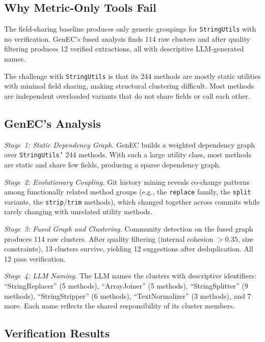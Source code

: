 \documentclass[sigconf]{acmart}
\begin{document}
\subsection{Why Metric-Only Tools Fail}
\label{sec:metric-fail}

The field-sharing baseline produces only generic groupings for
\texttt{StringUtils} with no verification. GenEC's fused analysis finds 114
raw clusters and after quality filtering produces 12 verified extractions,
all with descriptive LLM-generated names.

The challenge with \texttt{StringUtils} is that its 244 methods are mostly
static utilities with minimal field sharing, making structural clustering
difficult. Most methods are independent overloaded variants that do not share
fields or
call each other.

\subsection{GenEC's Analysis}
\label{sec:genec-analysis}

\textit{Stage~1: Static Dependency Graph.}  GenEC builds a weighted dependency
graph over \texttt{StringUtils'} 244 methods. With such a large utility class,
most methods are static and share few fields, producing a sparse dependency
graph.

\textit{Stage~2: Evolutionary Coupling.}  Git history mining reveals co-change
patterns among functionally related method groups (e.g., the \texttt{replace}
family, the \texttt{split} variants, the \texttt{strip}/\texttt{trim} methods),
which changed together across commits while rarely changing with unrelated
utility methods.

\textit{Stage~3: Fused Graph and Clustering.}  Community detection on the fused
graph produces 114 raw clusters. After quality filtering (internal cohesion
$> 0.35$, size constraints), 13 clusters survive, yielding 12 suggestions after
deduplication. All 12 pass verification.

\textit{Stage~4: LLM Naming.}  The LLM names the clusters with descriptive
identifiers: ``StringReplacer'' (5 methods), ``ArrayJoiner'' (5 methods),
``StringSplitter'' (9 methods), ``StringStripper'' (6 methods),
``TextNormalizer'' (3 methods), and 7 more. Each name reflects the shared
responsibility of its cluster members.

\subsection{Verification Results}
\label{sec:verif-results}
\end{document}
